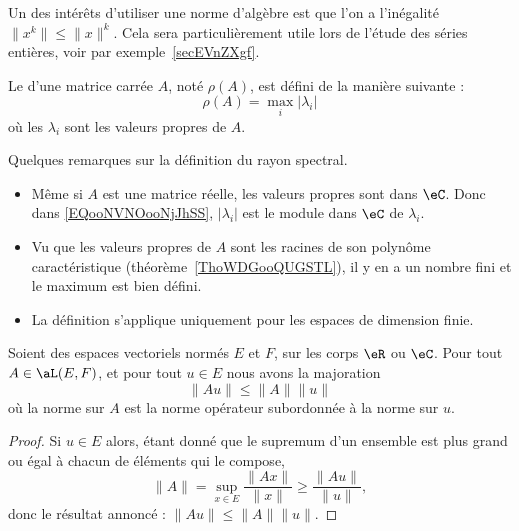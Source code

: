 Un des intérêts d'utiliser une norme d'algèbre est que l'on a l'inégalité \( \| x^k \|\leq \| x \|^k \). Cela sera particulièrement utile lors de l'étude des séries entières, voir par exemple~\ref{secEVnZXgf}.

\begin{definition}      \label{DEFooEAUKooSsjqaL}
    Le  d'une matrice carrée $A$, noté $\rho(A)$, est défini de la manière suivante :
    \begin{equation}    \label{EQooNVNOooNjJhSS}
        \rho(A)=\max_i|\lambda_i|
    \end{equation}
    où les $\lambda_i$ sont les valeurs propres de $A$.
\end{definition}

\begin{normaltext}
    Quelques remarques sur la définition du rayon spectral.
    \begin{itemize}
        \item
             Même si \( A\) est une matrice réelle, les valeurs propres sont dans \( \eC\). Donc dans \eqref{EQooNVNOooNjJhSS}, \( | \lambda_i |\) est le module dans \( \eC\) de \( \lambda_i\).
        \item
            Vu que les valeurs propres de \( A\) sont les racines de son polynôme caractéristique (théorème~\ref{ThoWDGooQUGSTL}), il y en a un nombre fini et le maximum est bien défini.
        \item
            La définition s'applique uniquement pour les espaces de dimension finie.
    \end{itemize}
\end{normaltext}

\begin{lemma}       \label{LEMooIBLEooLJczmu}
    Soient des espaces vectoriels normés \( E\) et \( F\), sur les corps \( \eR\) ou \( \eC\). Pour tout \( A\in \aL(E,F)\), et pour tout \( u\in E\) nous avons la majoration
    \begin{equation}
        \| Au \|\leq \| A \|\| u \|
    \end{equation}
    où la norme sur \( A\) est la norme opérateur subordonnée à la norme sur \( u\).
\end{lemma}

\begin{proof}
    Si \( u\in E\) alors, étant donné que le supremum d'un ensemble est plus grand ou égal à chacun de éléments qui le compose,
    \begin{equation}
        \| A \|=\sup_{x\in E}\frac{ \| Ax \| }{ \| x \| }\geq \frac{ \| Au \| }{ \| u \| },
    \end{equation}
    donc le résultat annoncé : \( \| Au \|\leq \| A \|\| u \|\).
\end{proof}

